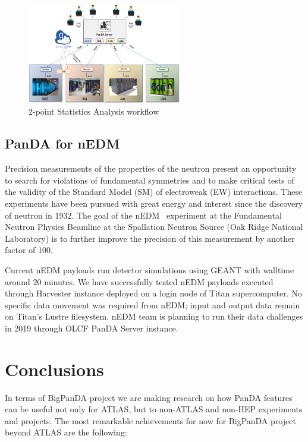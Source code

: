 \documentclass{webofc}
\begin{document}
\begin{figure}
	\centering
	\includegraphics[width=0.60\textwidth]{figures/LQCD_future_environment.png}
	\caption{2-point Statistics Analysis workflow}
	\label{fig:lqcd_env}
\end{figure}


\subsection{PanDA for nEDM}

Precision measurements of the properties of the neutron present an opportunity to search for violations of fundamental symmetries and to make critical tests of the validity of the Standard Model (SM) of electroweak (EW) interactions. These experiments have been pursued with great energy and interest since the discovery of neutron in 1932.  The goal of the nEDM~\cite{Lamoreaux_2009} experiment at the Fundamental Neutron Physics Beamline at the Spallation Neutron Source (Oak Ridge National Laboratory) is to further improve the precision of this measurement by another factor of 100.

Current nEDM payloads run detector simulations using GEANT with walltime around 20 minutes. We have successfully tested nEDM payloads executed through Harvester instance deployed on a login node of Titan supercomputer. No specific data movement was required from nEDM; input and output data remain on Titan’s Lustre filesystem. nEDM team is planning to run their data challenges in 2019 through OLCF PanDA Server instance.


\section{Conclusions}

In terms of BigPanDA project we are making research on how PanDA features can be useful not only for ATLAS, but to non-ATLAS and non-HEP experiments and projects.
The most remarkable achievements for now for BigPanDA project beyond ATLAS are the following:
\end{document}
